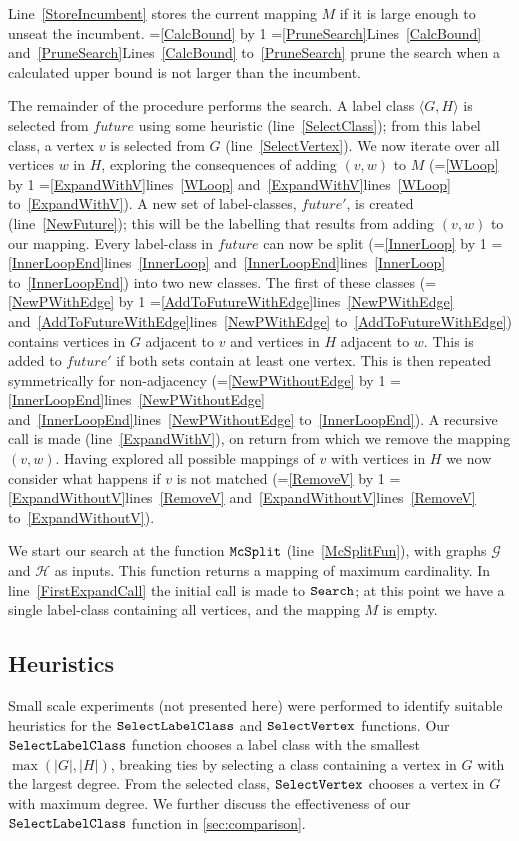 \documentclass[letterpaper]{article}
\newcommand{\AlgVar}[1]{\mathit{#1}}
\newcommand{\graphG}{\mathcal{G}}
\newcommand{\graphH}{\mathcal{H}}
\newcommand{\setG}{G}
\newcommand{\setH}{H}
\newcommand{\lineref}[1]{line~\ref{#1}}
\newcommand{\linerangeref}[2]{\count255=\ref{#1}\advance\count255 by 1 \ifnum\count255=\ref{#2}lines~\ref{#1} and~\ref{#2}\else lines~\ref{#1} to~\ref{#2}\fi}
\newcommand{\Lineref}[1]{Line~\ref{#1}}
\newcommand{\Linerangeref}[2]{\count255=\ref{#1}\advance\count255 by 1 \ifnum\count255=\ref{#2}Lines~\ref{#1} and~\ref{#2}\else Lines~\ref{#1} to~\ref{#2}\fi}
\begin{document}
\Lineref{StoreIncumbent} stores the current mapping $M$ if it is large enough
to unseat the incumbent.  \Linerangeref{CalcBound}{PruneSearch} prune the
search when a calculated upper bound is not larger than the incumbent.

The remainder of the procedure performs the search.  A label class
$\langle \setG, \setH \rangle$ is selected from $\AlgVar{future}$
using some heuristic
(\lineref{SelectClass}); from this label class, a vertex $v$ is selected
from $\setG$ (\lineref{SelectVertex}). We now iterate over all
vertices $w$ in $\setH$, exploring the consequences of adding $(v,w)$ to $M$
(\linerangeref{WLoop}{ExpandWithV}).  A new set of label-classes,
$\AlgVar{future'}$,
is created (\lineref{NewFuture}); this will be the labelling that results
from adding $(v,w)$ to our mapping.  Every label-class in $\AlgVar{future}$ can
now be split (\linerangeref{InnerLoop}{InnerLoopEnd}) into two new classes. The
first of these classes (\linerangeref{NewPWithEdge}{AddToFutureWithEdge})
contains vertices in $\setG$ adjacent to $v$ and vertices in $\setH$ adjacent to $w$.
This is added to $\AlgVar{future'}$ if both sets contain at least one vertex.
This is then repeated symmetrically for non-adjacency
(\linerangeref{NewPWithoutEdge}{InnerLoopEnd}). A recursive call is made
(\lineref{ExpandWithV}), on return from which we remove the mapping $(v,w)$.
Having explored all possible mappings of $v$ with vertices in $\setH$ we now
consider what happens if $v$ is not matched
(\linerangeref{RemoveV}{ExpandWithoutV}).

We start our search at the function $\FuncSty{McSplit}$ (\lineref{McSplitFun}),
with graphs $\graphG$ and $\graphH$ as inputs.  This function returns a mapping of
maximum cardinality.  In \lineref{FirstExpandCall} the initial call is made to
$\FuncSty{Search}$; at this point we have a single label-class containing all
vertices, and the mapping $M$ is empty.

\subsection{Heuristics}

Small scale experiments (not presented here) were performed to identify
suitable heuristics for the $\FuncSty{SelectLabelClass}$ and
$\FuncSty{SelectVertex}$ functions.  Our $\FuncSty{SelectLabelClass}$
function chooses a label class with the smallest $\max(|\setG|,|\setH|)$,
breaking ties by selecting a class containing a vertex in $G$ with the largest degree. From
the selected class, $\FuncSty{SelectVertex}$ chooses a vertex in $\setG$ with
maximum degree. We further discuss the effectiveness of our
$\FuncSty{SelectLabelClass}$ function in \cref{sec:comparison}.
\end{document}
